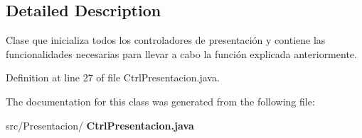 \subsection{Detailed Description}
Clase que inicializa todos los controladores de presentación y contiene las funcionalidades necesarias para llevar a cabo la función explicada anteriormente. 

Definition at line 27 of file Ctrl\+Presentacion.\+java.



The documentation for this class was generated from the following file\+:\begin{DoxyCompactItemize}
\item 
src/\+Presentacion/\textbf{ Ctrl\+Presentacion.\+java}\end{DoxyCompactItemize}
